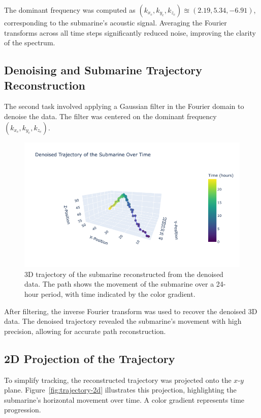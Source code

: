 \documentclass[11pt]{amsart}
\begin{document}
The dominant frequency was computed as $(k_{x_c}, k_{y_c}, k_{z_c}) \approxeq (2.19, 5.34, -6.91)$, corresponding to the submarine's acoustic signal. Averaging the Fourier transforms across all time steps significantly reduced noise, improving the clarity of the spectrum.

\subsection{Denoising and Submarine Trajectory Reconstruction}

The second task involved applying a Gaussian filter in the Fourier domain to denoise the data. The filter was centered on the dominant frequency $(k_{x_c}, k_{y_c}, k_{z_c})$.

\begin{figure}[htp]
    \centering
    \includegraphics[width=\textwidth]{filtered_data.png}
    \caption{3D trajectory of the submarine reconstructed from the denoised data. The path shows the movement of the submarine over a 24-hour period, with time indicated by the color gradient.}
    \label{fig:trajectory-3d}
\end{figure}

After filtering, the inverse Fourier transform was used to recover the denoised 3D data.
The denoised trajectory revealed the submarine's movement with high precision, allowing for accurate path reconstruction.

\subsection{2D Projection of the Trajectory}

To simplify tracking, the reconstructed trajectory was projected onto the $x$-$y$ plane. Figure~\ref{fig:trajectory-2d} illustrates this projection, highlighting the submarine's horizontal movement over time. A color gradient represents time progression.
\end{document}
